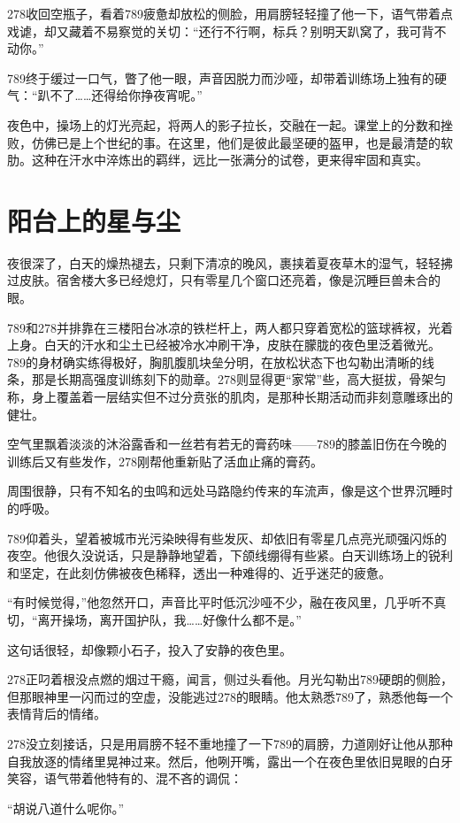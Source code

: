 \documentclass[a4paper]{book}
\begin{document}
278收回空瓶子，看着789疲惫却放松的侧脸，用肩膀轻轻撞了他一下，语气带着点戏谑，却又藏着不易察觉的关切：“还行不行啊，标兵？别明天趴窝了，我可背不动你。”

789终于缓过一口气，瞥了他一眼，声音因脱力而沙哑，却带着训练场上独有的硬气：“趴不了……还得给你挣夜宵呢。”

夜色中，操场上的灯光亮起，将两人的影子拉长，交融在一起。课堂上的分数和挫败，仿佛已是上个世纪的事。在这里，他们是彼此最坚硬的盔甲，也是最清楚的软肋。这种在汗水中淬炼出的羁绊，远比一张满分的试卷，更来得牢固和真实。
\normalsize
\section{阳台上的星与尘}
\songti{}
夜很深了，白天的燥热褪去，只剩下清凉的晚风，裹挟着夏夜草木的湿气，轻轻拂过皮肤。宿舍楼大多已经熄灯，只有零星几个窗口还亮着，像是沉睡巨兽未合的眼。

789和278并排靠在三楼阳台冰凉的铁栏杆上，两人都只穿着宽松的篮球裤衩，光着上身。白天的汗水和尘土已经被冷水冲刷干净，皮肤在朦胧的夜色里泛着微光。789的身材确实练得极好，胸肌腹肌块垒分明，在放松状态下也勾勒出清晰的线条，那是长期高强度训练刻下的勋章。278则显得更“家常”些，高大挺拔，骨架匀称，身上覆盖着一层结实但不过分贲张的肌肉，是那种长期活动而非刻意雕琢出的健壮。

空气里飘着淡淡的沐浴露香和一丝若有若无的膏药味——789的膝盖旧伤在今晚的训练后又有些发作，278刚帮他重新贴了活血止痛的膏药。

周围很静，只有不知名的虫鸣和远处马路隐约传来的车流声，像是这个世界沉睡时的呼吸。

789仰着头，望着被城市光污染映得有些发灰、却依旧有零星几点亮光顽强闪烁的夜空。他很久没说话，只是静静地望着，下颌线绷得有些紧。白天训练场上的锐利和坚定，在此刻仿佛被夜色稀释，透出一种难得的、近乎迷茫的疲惫。

“有时候觉得，”他忽然开口，声音比平时低沉沙哑不少，融在夜风里，几乎听不真切，“离开操场，离开国护队，我……好像什么都不是。”

这句话很轻，却像颗小石子，投入了安静的夜色里。

278正叼着根没点燃的烟过干瘾，闻言，侧过头看他。月光勾勒出789硬朗的侧脸，但那眼神里一闪而过的空虚，没能逃过278的眼睛。他太熟悉789了，熟悉他每一个表情背后的情绪。

278没立刻接话，只是用肩膀不轻不重地撞了一下789的肩膀，力道刚好让他从那种自我放逐的情绪里晃神过来。然后，他咧开嘴，露出一个在夜色里依旧晃眼的白牙笑容，语气带着他特有的、混不吝的调侃：

“胡说八道什么呢你。”
\end{document}
